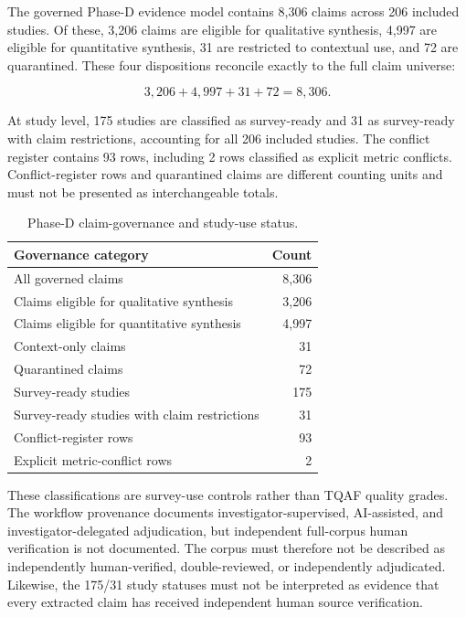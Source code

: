 The governed Phase-D evidence model contains 8,306 claims across 206 included
studies. Of these, 3,206 claims are eligible for qualitative synthesis, 4,997
are eligible for quantitative synthesis, 31 are restricted to contextual use,
and 72 are quarantined. These four dispositions reconcile exactly to the full
claim universe:

\begin{equation}
3{,}206 + 4{,}997 + 31 + 72 = 8{,}306.
\end{equation}

At study level, 175 studies are classified as survey-ready and 31 as
survey-ready with claim restrictions, accounting for all 206 included studies.
The conflict register contains 93 rows, including 2 rows classified as explicit
metric conflicts. Conflict-register rows and quarantined claims are different
counting units and must not be presented as interchangeable totals.

\begin{table}[htbp]
\caption{Phase-D claim-governance and study-use status.}
\label{tab:phase_d_claim_governance}
\centering
\begin{tabular}{lr}
\toprule
\textbf{Governance category} & \textbf{Count} \\
\midrule
All governed claims & 8,306 \\
Claims eligible for qualitative synthesis & 3,206 \\
Claims eligible for quantitative synthesis & 4,997 \\
Context-only claims & 31 \\
Quarantined claims & 72 \\
Survey-ready studies & 175 \\
Survey-ready studies with claim restrictions & 31 \\
Conflict-register rows & 93 \\
Explicit metric-conflict rows & 2 \\
\bottomrule
\end{tabular}
\end{table}

These classifications are survey-use controls rather than TQAF quality grades.
The workflow provenance documents investigator-supervised, AI-assisted, and
investigator-delegated adjudication, but independent full-corpus human verification
is not documented. The corpus must therefore not be described as independently
human-verified, double-reviewed, or independently adjudicated. Likewise, the
175/31 study statuses must not be interpreted as evidence that every extracted
claim has received independent human source verification.


